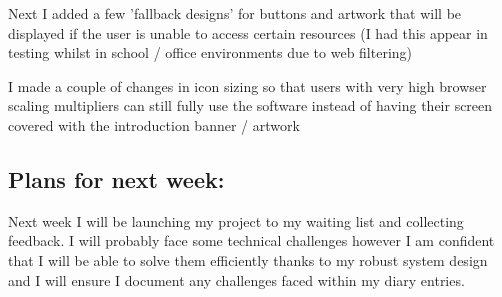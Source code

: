 Next I added a few 'fallback designs' for buttons and artwork that will be displayed if the user is unable to access certain resources (I had this appear in testing whilst in school / office environments due to web filtering)

I made a couple of changes in icon sizing so that users with very high browser scaling multipliers can still fully use the software instead of having their screen covered with the introduction banner / artwork

\subsection*{Plans for next week:}
Next week I will be launching my project to my waiting list and collecting feedback. I will probably face some technical challenges however I am confident that I will be able to solve them efficiently thanks to my robust system design and I will ensure I document any challenges faced within my diary entries.
